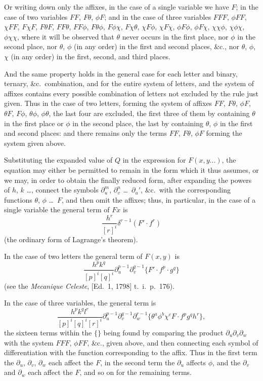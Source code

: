 \documentclass[11pt,a4paper]{book}
\begin{document}
Or writing down only the affixes, in the case of a single variable we have $F$; in the case of two variables $FF$, $F\theta$, $\phi F$; and in the case of three variables $FFF$, $\phi FF$, $\chi FF$, $F\chi F$, $F\theta F$, $FF\theta$, $FF\phi$, $F\theta\phi$, $F\phi\chi$, $F\chi\theta$, $\chi F\phi$, $\chi F\chi$, $\phi F\phi$, $\phi F\chi$, $\chi\chi\phi$, $\chi\phi\chi$, $\phi\chi\chi$, where it will be observed that $\theta$ never occurs in the first place, nor $\phi$ in the second place, nor $\theta$, $\phi$ (in any order) in the first and second places, \&c., nor $\theta$, $\phi$, $\chi$ (in any order) in the first, second, and third places.

And the same property holds in the general case for each letter and binary, ternary, \&c.\ combination, and for the entire system of letters, and the system of affixes contains every possible combination of letters not excluded by the rule just given. Thus in the case of two letters, forming the system of affixes $FF$, $F\theta$, $\phi F$, $\theta F$, $F\phi$, $\theta\phi$, $\phi\theta$, the last four are excluded, the first three of them by containing $\theta$ in the first place or $\phi$ in the second place, the last by containing $\theta$, $\phi$ in the first and second places: and there remains only the terms $FF$, $F\theta$, $\phi F$ forming the system given above.

Substituting the expanded value of $Q$ in the expression for $F(x,y\ldots)$, the equation may either be permitted to remain in the form which it thus assumes, or we may, in order to obtain the finally reduced form, after expanding the powers of $h$, $k$ \ldots, connect the symbols $\partial_u^m$, $\partial_v^n$ \ldots\ $\partial_u'$, \&c.\ with the corresponding functions $\theta$, $\phi$ \ldots\ $F$, and then omit the affixes; thus, in particular, in the case of a single variable the general term of $Fx$ is
\[ \frac{h^r}{[r]^i} \delta^{r-1}(F' \cdot f^r) \]
(the ordinary form of Lagrange's theorem).

In the case of two letters the general term of $F(x,y)$ is
\[ \frac{h^p k^q}{[p]^i [q]^i} \partial_u^{p-1} \partial_v^{q-1} \{ F' \cdot f^p \cdot g^q \} \]
(see the \textit{Mecanique Celeste}, [Ed.\ 1, 1798] t.\ i.\ p.\ 176).

In the case of three variables, the general term is
\[ \frac{h^p k^q l^r}{[p]^i [q]^i [r]^i} \partial_u^{p-1} \partial_v^{q-1} \partial_w^{r-1} \{ \theta^a \phi^b \chi^c F \cdot f^p g^q h^r \}, \]
the sixteen terms within the $\{ \}$ being found by comparing the product $\partial_u \partial_v \partial_w$ with the system $FFF$, $\phi FF$, \&c., given above, and then connecting each symbol of differentiation with the function corresponding to the affix. Thus in the first term the $\partial_u$, $\partial_v$, $\partial_w$ each affect the $F$, in the second term the $\partial_u$ affects $\phi$, and the $\partial_v$ and $\partial_w$ each affect the $F$, and so on for the remaining terms.
\end{document}
